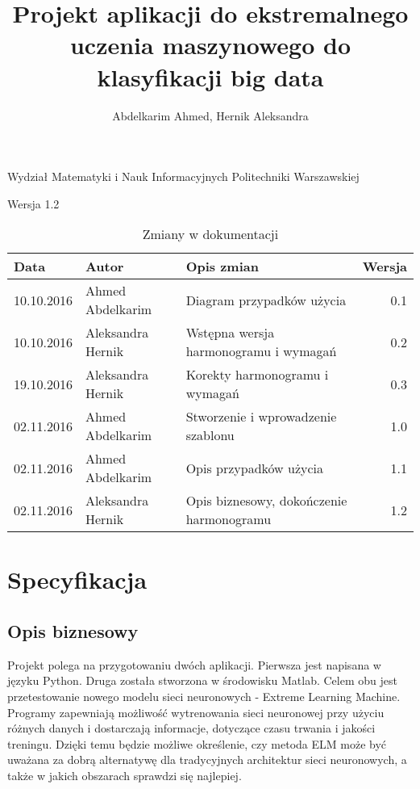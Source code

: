 \documentclass{article}
\title{Projekt aplikacji do ekstremalnego uczenia maszynowego do klasyfikacji big data}
\author{Abdelkarim Ahmed, Hernik Aleksandra}
\begin{document}
Wydział Matematyki i Nauk Informacyjnych Politechniki Warszawskiej
\vspace*{\fill}
\begin{center}
\begin{minipage}{.9\textwidth}
\maketitle
\begin{center}Wersja 1.2\end{center}
\end{minipage}
\end{center}
\vfill %
\clearpage
\noindent
\begin{table}[H]
\caption{Zmiany w dokumentacji}
\begin{tabular}{|l|l|l|r|}
\hline
\textbf{Data} & \textbf{Autor} & \textbf{Opis zmian} & \textbf{Wersja} \\
\hline
10.10.2016 & Ahmed Abdelkarim & Diagram przypadków użycia & 0.1 \\
10.10.2016 & Aleksandra Hernik & Wstępna wersja harmonogramu i wymagań & 0.2 \\
19.10.2016 & Aleksandra Hernik & Korekty harmonogramu i wymagań & 0.3 \\
02.11.2016 & Ahmed Abdelkarim & Stworzenie i wprowadzenie szablonu & 1.0 \\
02.11.2016 & Ahmed Abdelkarim & Opis przypadków użycia & 1.1 \\
02.11.2016 & Aleksandra Hernik & Opis biznesowy, dokończenie harmonogramu & 1.2 \\
\hline
\end{tabular}
\end{table}
\tableofcontents
\clearpage
\section{Specyfikacja}
\subsection{Opis biznesowy}
Projekt polega na przygotowaniu dwóch aplikacji. Pierwsza jest napisana w języku Python. Druga została stworzona w środowisku Matlab. Celem obu jest przetestowanie nowego modelu sieci neuronowych - Extreme Learning Machine. Programy zapewniają możliwość wytrenowania sieci neuronowej przy użyciu różnych danych i dostarczają informacje, dotyczące czasu trwania i jakości treningu. Dzięki temu będzie możliwe określenie, czy metoda ELM może być uważana za dobrą alternatywę dla tradycyjnych architektur sieci neuronowych, a także w jakich obszarach sprawdzi się najlepiej.
\end{document}
